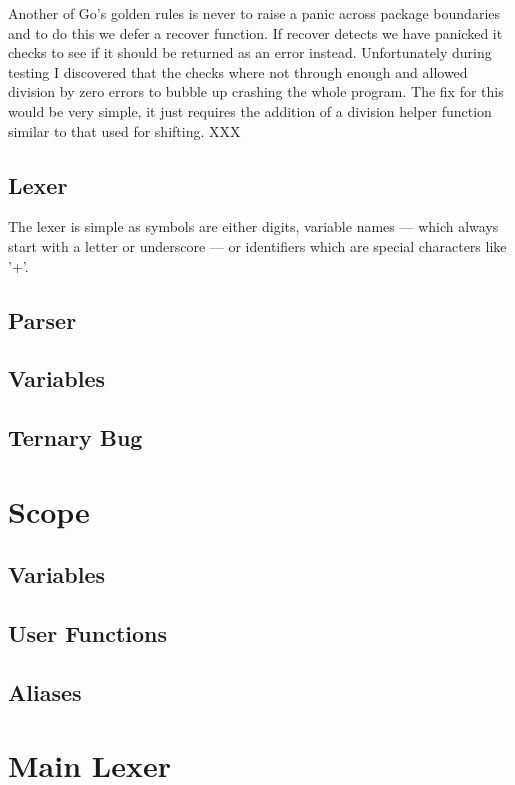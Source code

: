 Another of Go's golden rules is never to raise a panic across package boundaries and to do this we defer a recover function.
If recover detects we have panicked it checks to see if it should be returned as an error instead.
Unfortunately during testing I discovered that the checks where not through enough and allowed division by zero errors to bubble up crashing the whole program. 
The fix for this would be very simple, it just requires the addition of a division helper function similar to that used for shifting\cite{lst:arith-shift}. XXX %

\subsection{Lexer}
The lexer is simple as symbols are either digits, variable names --- which always start with a letter or underscore --- or identifiers which are special characters like '+'.


\subsection{Parser}

\subsection{Variables}
\subsection{Ternary Bug}

\section{Scope}

\subsection{Variables}
\subsection{User Functions}
\subsection{Aliases}

\section{Main Lexer}


